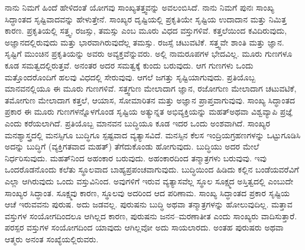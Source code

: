 ನಾನು ನಿಮಗೆ ಹಿಂದೆ ಹೇಳಿದಂತೆ ಯೋಗವು ಸಾಂಖ್ಯತತ್ತ್ವವನ್ನು ಅವಲಂಬಿಸಿದೆ. ನಾನು ನಿಮಗೆ ಪುನಃ ಸಾಂಖ್ಯ ಸಿದ್ಧಾಂತದ ಸೃಷ್ಟಿವಾದವನ್ನು ಹೇಳುತ್ತೇನೆ. ಸಾಂಖ್ಯರ ದೃಷ್ಟಿಯಲ್ಲಿ ಪ್ರಕೃತಿಯೇ ಸೃಷ್ಟಿಯ ಉದಾದಾನ ಮತ್ತು ನಿಮಿತ್ತ ಕಾರಣ. ಪ್ರಕೃತಿಯಲ್ಲಿ ಸತ್ತ್ವ, ರಜಸ್ಸು, ತಮಸ್ಸು ಎಂಬ ಮೂರು ವಿಧದ ವಸ್ತುಗಳಿವೆ. ಕತ್ತಲೆಯಿಂದ ಕವಿದಿರುವುದು, ಅಜ್ಞಾನದಲ್ಲಿರುವುದು ಮತ್ತು ಭಾರವಾಗಿರುವುದೆಲ್ಲ ತಮಸ್ಸು. ರಜಸ್ಸೆ ಚಟುವಟಿಕೆ. ಸತ್ತ್ವವೇ ಶಾಂತಿ ಮತ್ತು ಜ್ಞಾನ. ಸೃಷ್ಟಿಗೆ ಮುಂಚಿನ ಪ್ರಕೃತಿಯನ್ನು ಅವರು ಅವ್ಯಕ್ತವೆನ್ನುವರು. ಅಲ್ಲಿ ನಾಮರೂಪಗಳ ಭೇದವಿಲ್ಲ. ಮೂರು ಗುಣಗಳೂ ಕೂಡ ಸಮತ್ವದಲ್ಲಿರುತ್ತವೆ. ಅನಂತರ ಅದರ ಸಮತ್ವಕ್ಕೆ ಕುಂದು ಬರುವುದು. ಆಗ ಗುಣಗಳು ಒಂದು ಮತ್ತೊಂದರೊಂದಿಗೆ ಹಲವು ವಿಧದಲ್ಲಿ ಸೇರುವುವು. ಆಗಲೆ ಜಗತ್ತು ಸೃಷ್ಟಿಯಾಗುವುದು. ಪ್ರತಿಯೊಬ್ಬ ಮಾನವನಲ್ಲಿಯೂ ಈ ಮೂರು ಗುಣಗಳಿವೆ. ಸತ್ತ್ವಗುಣ ಮೇಲಾದಾಗ ಜ್ಞಾನ, ರಜೋಗುಣ ಮೇಲಾದಾಗ ಚಟುವಟಿಕೆ, ತಮೋಗುಣ ಮೇಲಾದಾಗ ಕತ್ತಲೆ, ಆಯಾಸ, ಸೋಮಾರಿತನ ಮತ್ತು ಅಜ್ಞಾನ ಪ್ರಾಪ್ತವಾಗುವುವು. ಸಾಂಖ್ಯ ಸಿದ್ಧಾಂತದ ಪ್ರಕಾರ ಈ ಮೂರು ಗುಣಗಳನ್ನೊಳಗೊಂಡ ಸೃಷ್ಟಿಯ ಅತ್ಯುನ್ನತ ಅಭಿವ್ಯಕ್ತಿಯನ್ನು ಮಹತ್​ ಅಥವಾ ವಿಶ್ವವ್ಯಾಪಿ ಪ್ರಜ್ಞೆ ಎಂದು ಕರೆಯಲಾಗಿದೆ. ಪ್ರತಿಯೊಬ್ಬ ಮಾನವನ ಬುದ್ಧಿಯೂ ಕೂಡ ಇದರ ಒಂದು ಅಂಶವಾಗಿದೆ. ಸಾಂಖ್ಯರ ಮನಶ್ಯಾಸ್ತ್ರದಲ್ಲಿ ಮನಸ್ಸಿಗೂ ಬುದ್ಧಿಗೂ ಸ್ಪಷ್ಟವಾದ ವ್ಯತ್ಯಾಸವಿದೆ. ಮನಸ್ಸಿನ ಕೆಲಸ ಇಂದ್ರಿಯಗ್ರಹಣಗಳನ್ನು ಒಟ್ಟುಗೂಡಿಸಿ ಅದನ್ನು ಬುದ್ಧಿಗೆ (ವ್ಯಕ್ತಿಗತವಾದ ಮಹತ್​) ತೆಗೆದುಕೊಂಡು ಹೋಗುವುದು. ಬುದ್ಧಿಯು ಅದರ ಮೇಲೆ ನಿರ್ಧರಿಸುವುದು. ಮಹತ್​ನಿಂದ ಅಹಂಕಾರ ಬರುವುದು. ಅಹಂಕಾರದಿಂದ ತನ್ಮಾತ್ರಗಳು ಬರುವುವು. ಇವು ಒಂದರೊಡನೊಂದು ಕಲೆತು ಸ್ಥೂಲವಾದ ಬಾಹ್ಯಪ್ರಪಂಚವಾಗುವುದು. ಬುದ್ಧಿಯಿಂದ ಹಿಡಿದು ಕಲ್ಲಿನ ಬಂಡೆಯವರೆವಿಗೆ ಎಲ್ಲಾ ಆಗಿರುವುದು ಒಂದು ವಸ್ತುವಿನಿಂದ. ಅವುಗಳಿಗೆ ಇರುವ ವ್ಯತ್ಯಾಸವೆಲ್ಲ ಸ್ಥೂಲ ಸೂಕ್ಷ್ಮದ ಅಸ್ತಿತ್ವದಲ್ಲಿ ಎಂಬುದೇ ಸಾಂಖ್ಯರ ಸಿದ್ಧಾಂತ. ಸೂಕ್ಷ್ಮವು ಕಾರಣ, ಸ್ಥೂಲವು ಅದರಿಂದ ಆದ ಪರಿಣಾಮ. ಸಾಂಖ್ಯ ಸಿದ್ಧಾಂತದ ಪ್ರಕಾರ ಸೃಷ್ಟಿಯ ಆಚೆ ಇರುವವನು ಪುರುಷ. ಅದು ಜಡವಲ್ಲ. ಪುರುಷನು ಬುದ್ಧಿ ಅಥವಾ ತನ್ಮಾತ್ರಗಳನ್ನು ಹೋಲುವುದಿಲ್ಲ. ಮತ್ತಾವ ವಸ್ತುಗಳ ಸಂಯೋಗದಿಂದಲೂ ಆಗಿಲ್ಲದ ಕಾರಣ, ಪುರುಷನು ಜನನ–ಮರಣಾತೀತ ಎಂದು ಸಾಂಖ್ಯರು ವಾದಿಸುತ್ತಾರೆ. ಪರಸ್ಪರ ವಸ್ತುಗಳ ಸಂಯೋಗದಿಂದ ಯಾವುದು ಆಗಿಲ್ಲವೋ ಅದು ಸಾಯಲಾರದು. ಅಂತಹ ಪುರುಷರು ಅಥವಾ ಆತ್ಮರು ಅನಂತ ಸಂಖ್ಯೆಯಲ್ಲಿರುವರು. 

